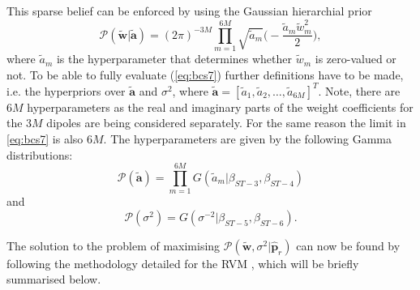 \documentclass[10pt,final]{IEEEtran}
\begin{document}
This sparse belief can be enforced by using the Gaussian hierarchial prior
\begin{equation}\label{eq:bcs7}
  \mathcal{P}(\tilde{\textbf{w}}|\tilde{\textbf{a}})=(2\pi)^{-3M}\prod_{m=1}^{6M}\sqrt{\tilde{a}_{m}}\Bigg(-\frac{\tilde{a}_{m}\tilde{w}_{m}^{2}}{2}\Bigg),
\end{equation}
where $\tilde{a}_{m}$ is the hyperparameter that determines whether $\tilde{w}_{m}$ is zero-valued or not. To be able to fully evaluate (\ref{eq:bcs7}) further definitions have to be made, i.e. the hyperpriors over $\tilde{\textbf{a}}$ and $\sigma^{2}$, where $\tilde{\textbf{a}}=[\tilde{a}_{1},\tilde{a}_{2}, \ldots, \tilde{a}_{6M}]^{T}$.  Note, there are $6M$ hyperparameters as the real and imaginary parts of the weight coefficients for the $3M$ dipoles are being considered separately.  For the same reason the limit in \eqref{eq:bcs7} is also $6M$.  The hyperparameters are given by the following Gamma distributions:
\begin{equation}\label{eq:bcs8}
  \mathcal{P}(\tilde{\textbf{a}})=\prod_{m=1}^{6M}G(\tilde{a}_{m}|\beta_{ST-3},\beta_{ST-4})
\end{equation}
and
\begin{equation}\label{eq:bcs9}
  \mathcal{P}(\sigma^{2})=G(\sigma^{-2}|\beta_{ST-5},\beta_{ST-6}).
\end{equation}

The solution to the problem of maximising $\mathcal{P}(\tilde{\textbf{w}},\sigma^{2}|\hat{\textbf{p}}_{r})$ can now be found by following the methodology detailed for the RVM \cite{Ji08,Tipping01,Tipping03}, which will be briefly summarised below.
\end{document}
